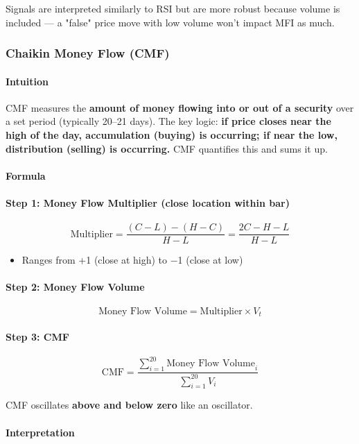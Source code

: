 \documentclass[12pt,openany]{book}
\begin{document}
Signals are interpreted similarly to RSI but are more robust because volume is included --- a "false" price move with low volume won't impact MFI as much.

\subsubsection{Chaikin Money Flow (CMF)}

\paragraph{Intuition}
CMF measures the \textbf{amount of money flowing into or out of a security} over a set period (typically 20--21 days). The key logic: \textbf{if price closes near the high of the day, accumulation (buying) is occurring; if near the low, distribution (selling) is occurring.} CMF quantifies this and sums it up.

\paragraph{Formula}

\paragraph{Step 1: Money Flow Multiplier (close location within bar)}
\[
\text{Multiplier} = \frac{(C - L) - (H - C)}{H - L} = \frac{2C - H - L}{H - L}
\]

\begin{itemize}[leftmargin=*]
    \item Ranges from +1 (close at high) to \(-\)1 (close at low)
\end{itemize}

\paragraph{Step 2: Money Flow Volume}
\[
\text{Money Flow Volume} = \text{Multiplier} \times V_t
\]

\paragraph{Step 3: CMF}
\[
\text{CMF} = \frac{\sum_{i=1}^{20} \text{Money Flow Volume}_i}{\sum_{i=1}^{20} V_i}
\]

CMF oscillates \textbf{above and below zero} like an oscillator.

\paragraph{Interpretation}
\end{document}
